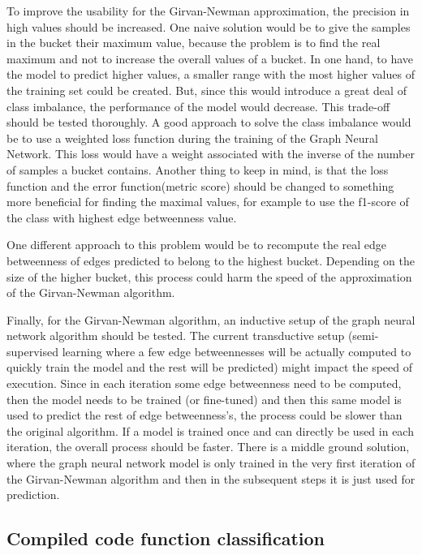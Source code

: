 To improve the usability for the Girvan-Newman approximation, the precision in high values should be increased. One naive solution would be to give the samples in the bucket their maximum value, because the problem is to find the real maximum and not to increase the overall values of a bucket. In one hand, to have the model to predict higher values, a smaller range with the most higher values of the training set could be created. But, since this would introduce a great deal of class imbalance, the performance of the model would decrease. This trade-off should be tested thoroughly. A good approach to solve the class imbalance would be to use a weighted loss function during the training of the Graph Neural Network. This loss would have a weight associated with the inverse of the number of samples a bucket contains. Another thing to keep in mind, is that the loss function and the error function(metric score) should be changed to something more beneficial for finding the maximal values, for example to use the f1-score of the class with highest edge betweenness value.

One different approach to this problem would be to recompute the real edge betweenness of edges predicted to belong to the highest bucket. Depending on the size of the higher bucket, this process could harm the speed of the approximation of the Girvan-Newman algorithm.

Finally, for the Girvan-Newman algorithm, an inductive setup of the graph neural network algorithm should be tested. The current transductive setup (semi-supervised learning where a few edge betweennesses will be actually computed to quickly train the model and the rest will be predicted) might impact the speed of execution. Since in each iteration some edge betweenness need to be computed, then the model needs to be trained (or fine-tuned) and then this same model is used to predict the rest of edge betweenness's, the process could be slower than the original algorithm. If a model is trained once and can directly be used in each iteration, the overall process should be faster. There is a middle ground solution, where the graph neural network model is only trained in the very first iteration of the Girvan-Newman algorithm and then in the subsequent steps it is just used for prediction. 



\newpage
\subsection{Compiled code function classification}





